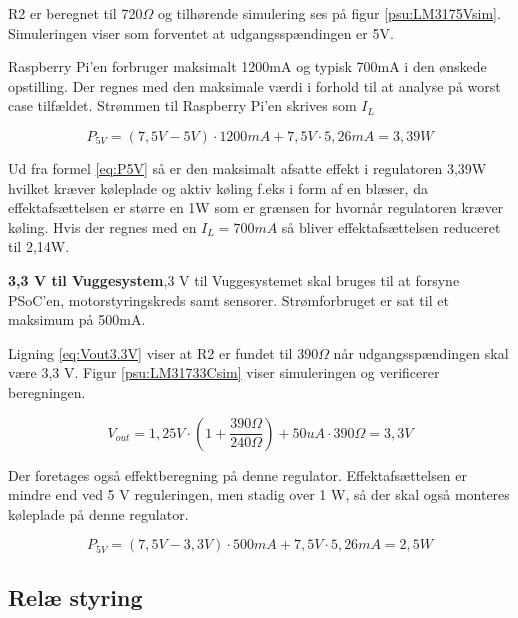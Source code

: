 R2 er beregnet til 720$\Omega$ og tilhørende simulering ses på figur \ref{psu:LM3175Vsim}. Simuleringen viser som forventet at udgangsspændingen er 5V. 


Raspberry Pi'en forbruger maksimalt 1200mA og typisk 700mA i den ønskede opstilling. Der regnes med den maksimale værdi i forhold til at analyse på worst case tilfældet. Strømmen til Raspberry Pi'en skrives som $I_{L}$

\begin{equation} 
{ P }_{ 5V }=(7,5V-5V)\cdot 1200mA+7,5V\cdot 5,26mA=3,39W
\label{eq:P5V}
\end{equation}

Ud fra formel \ref{eq:P5V} så er den maksimalt afsatte effekt i regulatoren 3,39W hvilket kræver køleplade og aktiv køling f.eks i form af en blæser, da effektafsættelsen er større en 1W som er grænsen for hvornår regulatoren kræver køling. Hvis der regnes med en $I_{L}=700mA$ så bliver effektafsættelsen reduceret til 2,14W.



\textbf{3,3 V til Vuggesystem},3 V til Vuggesystemet skal bruges til at forsyne PSoC'en, motorstyringskreds samt sensorer. Strømforbruget er sat til et maksimum på 500mA.

Ligning \ref{eq:Vout3.3V} viser at R2 er fundet til 390$\Omega$ når udgangsspændingen skal være 3,3 V. Figur \ref{psu:LM31733Csim} viser simuleringen og verificerer beregningen. 

\begin{equation} 
{ V }_{ out }=1,25V\cdot \left( 1+\frac { 390\Omega  }{ 240\Omega  }  \right) +50uA\cdot 390\Omega =3,3V
\label{eq:Vout3.3V}
\end{equation}


Der foretages også effektberegning på denne regulator. Effektafsættelsen er mindre end ved 5 V reguleringen, men stadig over 1 W, så der skal også monteres køleplade på denne regulator.

\begin{equation} 
{ P }_{ 5V }=(7,5V-3,3V)\cdot 500mA+7,5V\cdot 5,26mA=2,5W
\label{eq:P3.3V}
\end{equation}


\subsection{Relæ styring}

